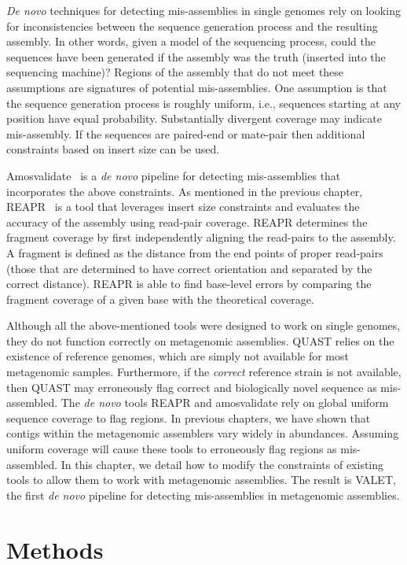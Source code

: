 \documentclass[12pt,\mydriver]{thesis}
\begin{document}
\emph{De novo} techniques for detecting mis-assemblies in single genomes rely on looking for inconsistencies between the sequence generation process and the resulting assembly.
In other words, given a model of the sequencing process, could the sequences have been generated if the assembly was the truth (inserted into the sequencing machine)?
Regions of the assembly that do not meet these assumptions are signatures of potential mis-assemblies.
One assumption is that the sequence generation process is roughly uniform, i.e., sequences starting at any position have equal probability.
Substantially divergent coverage may indicate mis-assembly.
If the sequences are paired-end or mate-pair then additional constraints based on insert size can be used.

Amosvalidate~\cite{amosvalidate2008} is a \emph{de novo} pipeline for detecting mis-assemblies that incorporates the above constraints.
As mentioned in the previous chapter, REAPR~\cite{hunt2013reapr} is a tool that leverages insert size constraints and evaluates the accuracy of the assembly using read-pair coverage.
REAPR determines the fragment coverage by first independently aligning the read-pairs to the assembly.
A fragment is defined as the distance from the end points of proper read-pairs (those that are determined to have correct orientation and separated by the correct distance).
REAPR is able to find base-level errors by comparing the fragment coverage of a given base with the theoretical coverage.

Although all the above-mentioned tools were designed to work on single genomes, they do not function correctly on metagenomic assemblies.
QUAST relies on the existence of reference genomes, which are simply not available for most metagenomic samples.
Furthermore, if the \emph{correct} reference strain is not available, then QUAST may erroneously flag correct and biologically novel sequence as mis-assembled.
The \emph{de novo} tools REAPR and amosvalidate rely on global uniform sequence coverage to flag regions.
In previous chapters, we have shown that contigs within the metagenomic assemblers vary widely in abundances.
Assuming uniform coverage will cause these tools to erroneously flag regions as mis-assembled.
In this chapter, we detail how to modify the constraints of existing tools to allow them to work with metagenomic assemblies.
The result is VALET, the first \emph{de novo} pipeline for detecting mis-assemblies in metagenomic assemblies.

\section{Methods}
\end{document}

